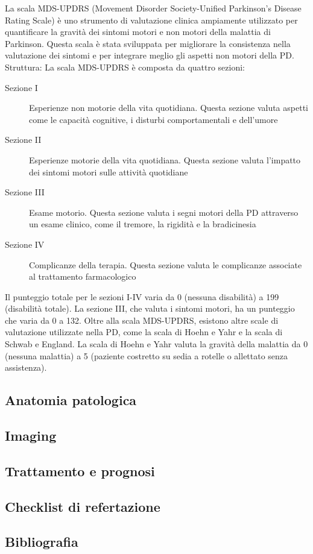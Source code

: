 \begin{Oss}
	La scala MDS-UPDRS (Movement Disorder Society-Unified Parkinson's Disease Rating Scale) è uno strumento di valutazione clinica ampiamente utilizzato per quantificare la gravità dei sintomi motori e non motori della malattia di Parkinson. Questa scala è stata sviluppata per migliorare la consistenza nella valutazione dei sintomi e per integrare meglio gli aspetti non motori della PD.
	Struttura: La scala MDS-UPDRS è composta da quattro sezioni:
	\begin{description}
		\item[Sezione I]{Esperienze non motorie della vita quotidiana. Questa sezione valuta aspetti come le capacità cognitive, i disturbi comportamentali e dell'umore}
		\item [Sezione II]{Esperienze motorie della vita quotidiana. Questa sezione valuta l'impatto dei sintomi motori sulle attività quotidiane}
		\item [Sezione III]{Esame motorio. Questa sezione valuta i segni motori della PD attraverso un esame clinico, come il tremore, la rigidità e la bradicinesia}
		\item[Sezione IV]{Complicanze della terapia. Questa sezione valuta le complicanze associate al trattamento farmacologico}
	\end{description}
	Il punteggio totale per le sezioni I-IV varia da 0 (nessuna disabilità) a 199 (disabilità totale). La sezione III, che valuta i sintomi motori, ha un punteggio che varia da 0 a 132.
	Oltre alla scala MDS-UPDRS, esistono altre scale di valutazione utilizzate nella PD, come la scala di Hoehn e Yahr e la scala di Schwab e England. La scala di Hoehn e Yahr valuta la gravità della malattia da 0 (nessuna malattia) a 5 (paziente costretto su sedia a rotelle o allettato senza assistenza).
\end{Oss}

\subsection{Anatomia patologica}

\subsection{Imaging}

\subsection{Trattamento e prognosi}

\subsection{Checklist di refertazione}

\subsection{Bibliografia}
\small{
	
	
}

